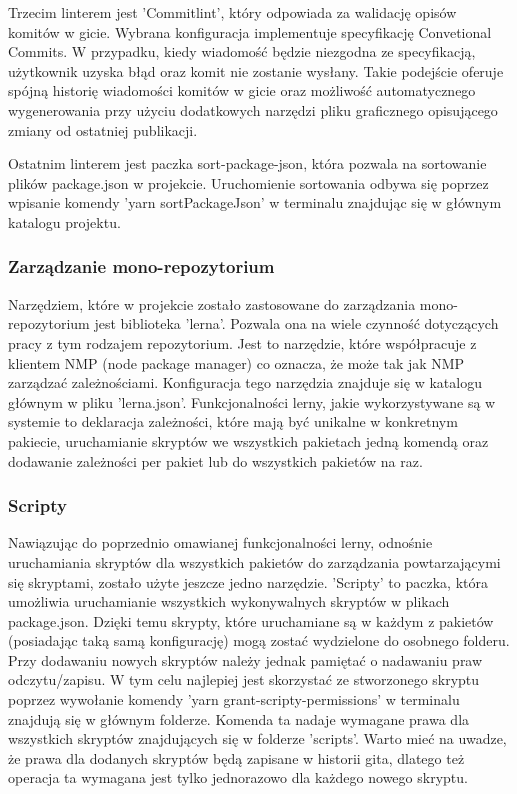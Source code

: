 Trzecim linterem jest 'Commitlint', który odpowiada za walidację opisów komitów w gicie. Wybrana konfiguracja implementuje specyfikację Convetional Commits. W przypadku, kiedy wiadomość będzie niezgodna ze specyfikacją, użytkownik uzyska błąd oraz komit nie zostanie wysłany. Takie podejście oferuje spójną historię wiadomości komitów w gicie oraz możliwość automatycznego wygenerowania przy użyciu dodatkowych narzędzi pliku graficznego opisującego zmiany od ostatniej publikacji.

Ostatnim linterem jest paczka sort-package-json, która pozwala na sortowanie plików package.json w projekcie. Uruchomienie sortowania odbywa się poprzez wpisanie komendy 'yarn sortPackageJson' w terminalu znajdując się w głównym katalogu projektu. 

\subsubsection{Zarządzanie mono-repozytorium}
Narzędziem, które w projekcie zostało zastosowane do zarządzania \break mono-repozytorium jest biblioteka 'lerna'. Pozwala ona na wiele czynność dotyczących pracy z tym rodzajem repozytorium. Jest to narzędzie, które współpracuje z klientem NMP (node package manager) co oznacza, że może tak jak NMP zarządzać zależnościami. Konfiguracja tego narzędzia znajduje się w katalogu głównym w pliku 'lerna.json'. Funkcjonalności lerny, jakie wykorzystywane są w systemie to deklaracja zależności, które mają być unikalne w konkretnym pakiecie, uruchamianie skryptów we wszystkich pakietach jedną komendą oraz dodawanie zależności per pakiet lub do wszystkich pakietów na raz.

\subsubsection{Scripty}
Nawiązując do poprzednio omawianej funkcjonalności lerny, odnośnie uruchamiania skryptów dla wszystkich pakietów do zarządzania powtarzającymi się skryptami, zostało użyte jeszcze jedno narzędzie. 'Scripty' to paczka, która umożliwia uruchamianie wszystkich wykonywalnych skryptów w plikach package.json. Dzięki temu skrypty, które uruchamiane są w każdym z pakietów (posiadając taką samą konfigurację) mogą zostać wydzielone do osobnego folderu. Przy dodawaniu nowych skryptów należy jednak pamiętać o nadawaniu praw odczytu/zapisu. W tym celu najlepiej jest skorzystać ze stworzonego skryptu poprzez wywołanie komendy 'yarn grant-scripty-permissions' w terminalu znajdują się w głównym folderze. Komenda ta nadaje wymagane prawa dla wszystkich skryptów znajdujących się w folderze 'scripts'. Warto mieć na uwadze, że prawa dla dodanych skryptów będą zapisane w historii gita, dlatego też operacja ta wymagana jest tylko jednorazowo dla każdego nowego skryptu.

